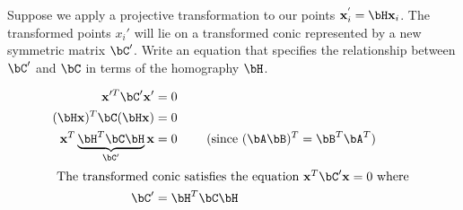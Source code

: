 \begin{problem}
\begin{enumalph}
    \newpage
    \item Suppose we apply a projective transformation to our
      points $\bx_i^{'} = \bH\bx_i$.
      The transformed points $x_i'$ will lie on a transformed
      conic represented by a new symmetric matrix $\bC'$.
      Write an equation that specifies the relationship between
      $\bC'$ and $\bC$ in terms of the homography $\bH$.
      \begin{answer}
        \begin{align*}
          \bx'^T\bC'\bx' &= 0 \\
          (\bH\bx)^T\bC(\bH\bx) &= 0 \\
          \bx^T \underbrace{\bH^T\bC\bH}_{\bC'}\bx &= 0 \qquad \text{ (since ${(\bA\bB)^T = \bB^T\bA^T}$) } \\
          \intertext{
            The transformed conic satisfies the equation
            $\bx^T\bC'\bx = 0$ where
          }
          \bC' &= \bH^T\bC\bH
        \end{align*}
      \end{answer}
  \end{enumalph}
\end{problem}
